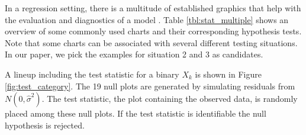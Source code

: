 \documentclass{article}
\begin{document}
In a regression setting, there is a multitude of established graphics that help with the evaluation and diagnostics of a model \citep{cook:99}. Table \ref{tbl:stat_multiple} shows an overview of some commonly used charts and their corresponding hypothesis tests. Note that some charts can be associated with several different testing situations. In our paper, we pick the examples for situation 2 and 3 as candidates.

A lineup including the test statistic  for a binary $X_k$ is shown in Figure \ref{fig:test_category}. The 19 null plots are generated  by simulating residuals from $N(0,\hat{\sigma}^2)$. The test statistic, the plot containing the observed data, is randomly placed among these null plots. If the test statistic is identifiable the null hypothesis is rejected. %
\end{document}
